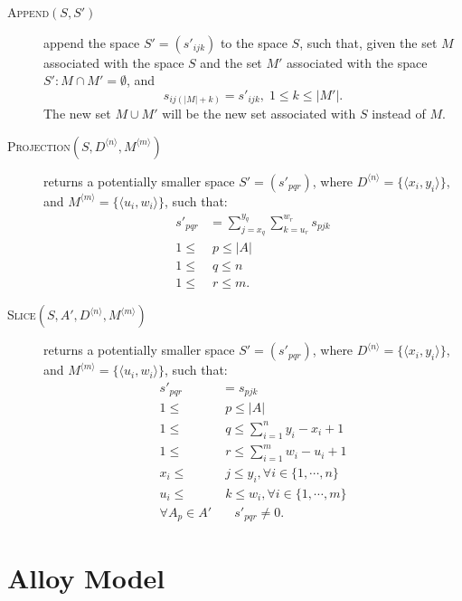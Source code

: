 \documentclass{article}
\begin{document}
\begin{description}
	\item[\textsc{Append}$(S,S')$] append the space
	$S'=\left(s'_{ijk}\right)$ to the space $S$,
		such that, given the set $M$ associated with the space $S$ and
		the set $M'$ associated with the space $S':
		M \cap M' = \emptyset$, and
		\[
			s_{ij(|M|+k)} = s'_{ijk}, \; 1 \leq k \leq |M'|.
		\]
		The new set $M \cup M'$ will be the new set associated with $S$
		instead of $M$.

	\item[\textsc{Projection}$(S, D^{\langle n \rangle}, M^{\langle m \rangle})$] 
		returns a potentially smaller space $S'=\left(s'_{pqr}\right)$,
		where $D^{\langle n \rangle} = \{\langle x_i, y_i \rangle\}$, and
		$M^{\langle m \rangle} = \{\langle u_i, w_i \rangle\}$,
		such that:
		\begin{align*}
			s'_{pqr} &= \sum_{j=x_q}^{y_q}{\sum_{k=u_r}^{w_r}{s_{pjk}}} \\ 
			1 \leq & \; p \leq |A| \\
			1 \leq & \; q \leq n \\
			1 \leq & \; r \leq m.
		\end{align*}

	\item[\textsc{Slice}$(S, A', D^{\langle n \rangle}, M^{\langle m \rangle})$] 
		returns a potentially smaller space $S'=\left(s'_{pqr}\right)$, 
		where $D^{\langle n \rangle} = \{\langle x_i, y_i \rangle\}$, and
		$M^{\langle m \rangle} = \{\langle u_i, w_i \rangle\}$,
		such that:
		\begin{align*}
			s'_{pqr} & = s_{pjk} \\
			1 \leq & \; p \leq |A| \\
			1 \leq & \; q \leq \sum_{i=1}^{n}{y_i-x_i+1} \\
			1 \leq & \; r \leq \sum_{i=1}^{m}{w_i-u_i+1} \\
			x_i \leq & \; j \leq y_i, \forall i \in \{1,\cdots,n\} \\
			u_i \leq & \; k \leq w_i, \forall i \in \{1,\cdots,m\} \\
			\forall A_{p} \in A' & \quad s'_{pqr} \neq 0.
		\end{align*}

\end{description}

\section{Alloy Model} %
\label{sec:alloy_model}

\inputminted{alloy}{model.als}%

\end{document}
